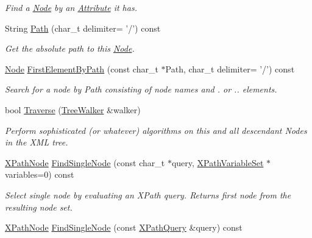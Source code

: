 \begin{DoxyCompactItemize}
\begin{DoxyCompactList}\small\item\em Find a \hyperlink{classphys_1_1xml_1_1Node}{Node} by an \hyperlink{classphys_1_1xml_1_1Attribute}{Attribute} it has. \item\end{DoxyCompactList}\item 
String \hyperlink{classphys_1_1xml_1_1Node_a0bf85dc0820ba204e7c9498c6651aec8}{Path} (char\_\-t delimiter= '/') const 
\begin{DoxyCompactList}\small\item\em Get the absolute path to this \hyperlink{classphys_1_1xml_1_1Node}{Node}. \item\end{DoxyCompactList}\item 
\hyperlink{classphys_1_1xml_1_1Node}{Node} \hyperlink{classphys_1_1xml_1_1Node_af2a9ac5c4e3252dca0e17720de093a9a}{FirstElementByPath} (const char\_\-t $\ast$Path, char\_\-t delimiter= '/') const 
\begin{DoxyCompactList}\small\item\em Search for a node by Path consisting of node names and . or .. elements. \item\end{DoxyCompactList}\item 
bool \hyperlink{classphys_1_1xml_1_1Node_a0029d08d3689c36d882ada0c0c9cf6e9}{Traverse} (\hyperlink{classphys_1_1xml_1_1TreeWalker}{TreeWalker} \&walker)
\begin{DoxyCompactList}\small\item\em Perform sophisticated (or whatever) algorithms on this and all descendant Nodes in the XML tree. \item\end{DoxyCompactList}\item 
\hyperlink{classphys_1_1xml_1_1XPathNode}{XPathNode} \hyperlink{classphys_1_1xml_1_1Node_a11966aa8afdfa586404393ebae9b07f5}{FindSingleNode} (const char\_\-t $\ast$query, \hyperlink{classphys_1_1xml_1_1XPathVariableSet}{XPathVariableSet} $\ast$variables=0) const 
\begin{DoxyCompactList}\small\item\em Select single node by evaluating an XPath query. Returns first node from the resulting node set. \item\end{DoxyCompactList}\item 
\hyperlink{classphys_1_1xml_1_1XPathNode}{XPathNode} \hyperlink{classphys_1_1xml_1_1Node_a13b958f663f9605061e5e47dfd8e1966}{FindSingleNode} (const \hyperlink{classphys_1_1xml_1_1XPathQuery}{XPathQuery} \&query) const 

\end{DoxyCompactItemize}
